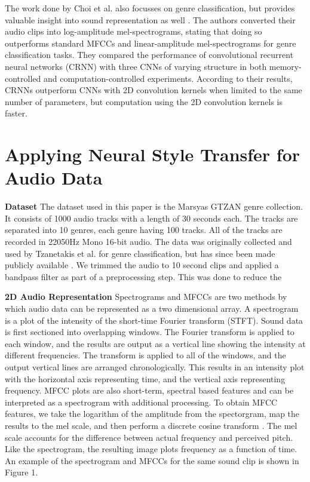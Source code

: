 \documentclass{article}
\begin{document}
The work done by Choi et al. also focusses on genre classification, but provides valuable insight into sound representation as well \citep{Choi2016}. The authors converted their audio clips into log-amplitude mel-spectrograms, stating that doing so outperforms standard MFCCs and linear-amplitude mel-spectrograms for genre classification tasks. They compared the performance of convolutional recurrent neural networks (CRNN) with three CNNs of varying structure in both memory-controlled and computation-controlled experiments. According to their results, CRNNs outperform CNNs with 2D convolution kernels when limited to the same number of parameters, but computation using the 2D convolution kernels is faster.

\section{Applying Neural Style Transfer for Audio Data}

\textbf{Dataset} The dataset used in this paper is the Marsyas GTZAN genre collection. It consists of 1000 audio tracks with a length of 30 seconds each. The tracks are separated into 10 genres, each genre having 100 tracks. All of the tracks are recorded in 22050Hz Mono 16-bit audio. The data was originally collected and used by Tzanetakis et al. for genre classification, but has since been made publicly available \citep{Tzanetakis2002}. We trimmed the audio to 10 second clips and applied a bandpass filter as part of a preprocessing step. This was done to reduce the 

\textbf{2D Audio Representation} Spectrograms and MFCCs are two methods by which audio data can be represented as a two dimensional array. A spectrogram is a plot of the intensity of the short-time Fourier transform (STFT). Sound data is first sectioned into overlapping windows. The Fourier transform is applied to each window, and the results are output as a vertical line showing the intensity at different frequencies. The transform is applied to all of the windows, and the output vertical lines are arranged chronologically. This results in an intensity plot with the horizontal axis representing time, and the vertical axis representing frequency. MFCC plots are also short-term, spectral based features and can be interpreted as a spectrogram with additional processing. To obtain MFCC features, we take the logarithm of the amplitude from the spectorgram, map the results to the mel scale, and then perform a discrete cosine transform \citep{Logan2000}. The mel scale accounts for the difference between actual frequency and perceived pitch. Like the spectrogram, the resulting image plots frequency as a function of time. An example of the spectrogram and MFCCs for the same sound clip is shown in Figure 1.
\end{document}
